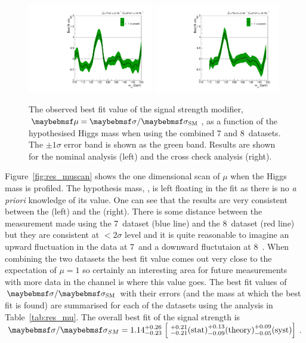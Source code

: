 \begin{figure}
  \includegraphics[width=0.49\textwidth]{results/plots/mva_greenband.pdf}
  \includegraphics[width=0.49\textwidth]{results/plots/sideband_greenband.pdf}
  \caption[The observed best fit value of the signal strength modifier $\mu$]{The observed best fit value of the signal strength modifier, $\mu=\musm$, as a function of the hypothesised Higgs mass \mH when using the combined 7 and 8~\TeV datasets. The $\pm1\sigma$ error band is shown as the green band. Results are shown for the nominal \MFM analysis (left) and the cross check \SMVA analysis (right).}
  \label{fig:res_mumh}
\end{figure}

Figure~\ref{fig:res_muscan} shows the one dimensional \NLL scan of $\mu$ when the Higgs mass \mH is profiled. The hypothesis mass, \mH, is left floating in the fit as there is no \textit{a priori} knowledge of its value. One can see that the results are very consistent between the \MFM (left) and the \SMVA (right). There is some distance between the measurement made using the 7~\TeV dataset (blue line) and the 8~\TeV dataset (red line) but they are consistent at $<2\sigma$ level and it is quite reasonable to imagine an upward fluctuation in the data at 7~\TeV and a downward fluctutaion at 8~\TeV. When combining the two datasets the best fit value comes out very close to the \SM expectation of $\mu=1$ so certainly an interesting area for future measurements with more data in the \Hgg channel is where this value goes. The best fit values of $\musm$ with their errors (and the mass at which the best fit is found) are summarised for each of the datasets using the \MFM analysis in Table~\ref{tab:res_mu}. The overall best fit of the signal strength is $\sigma/\sigma_{SM} = 1.14^{+0.26}_{-0.23} \;\Bigl[\;^{+0.21}_{-0.21} \mathrm{(stat)} ^{+0.13}_{-0.09} \mathrm{(theory)} ^{+0.09}_{-0.05} \mathrm{(syst)} \Bigr]$.

